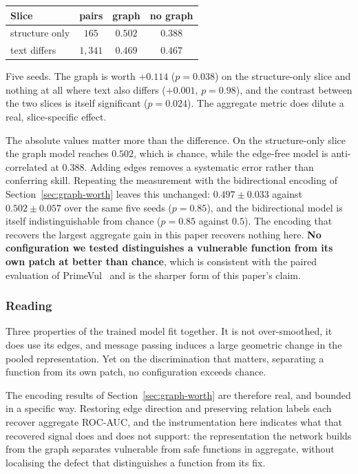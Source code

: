 \begin{center}
\begin{tabular}{lccc}
\toprule
\textbf{Slice} & \textbf{pairs} & \textbf{graph} & \textbf{no graph} \\
\midrule
structure only & $165$  & $0.502$ & $0.388$ \\
text differs   & $1{,}341$ & $0.469$ & $0.467$ \\
\bottomrule
\end{tabular}
\end{center}

\noindent Five seeds. The graph is worth $+0.114$ ($p=0.038$) on the
structure-only slice and nothing at all where text also differs ($+0.001$,
$p=0.98$), and the contrast between the two slices is itself significant
($p=0.024$). The aggregate metric does dilute a real, slice-specific effect.

The absolute values matter more than the difference. On the structure-only
slice the graph model reaches $0.502$, which is chance, while the edge-free
model is anti-correlated at $0.388$. Adding edges removes a systematic error
rather than conferring skill. Repeating the measurement with the bidirectional
encoding of Section~\ref{sec:graph-worth} leaves this unchanged: $0.497 \pm
0.033$ against $0.502 \pm 0.057$ over the same five seeds ($p=0.85$), and the
bidirectional model is itself indistinguishable from chance ($p=0.85$ against
$0.5$). The encoding that recovers the largest aggregate gain in this paper
recovers nothing here. \textbf{No configuration we tested distinguishes a
vulnerable function from its own patch at better than chance}, which is
consistent with the paired evaluation of PrimeVul~\citep{ding2024primevul} and
is the sharper form of this paper's claim.

\subsubsection{Reading}
Three properties of the trained model fit together. It is not over-smoothed, it
does use its edges, and message passing induces a large geometric change in the
pooled representation. Yet on the discrimination that matters, separating a
function from its own patch, no configuration exceeds chance.

The encoding results of Section~\ref{sec:graph-worth} are therefore real, and
bounded in a specific way. Restoring edge direction and preserving relation
labels each recover aggregate ROC-AUC, and the instrumentation here indicates
what that recovered signal does and does not support: the representation the network builds from the graph
separates vulnerable from safe functions in aggregate, without localising the
defect that distinguishes a function from its fix.

